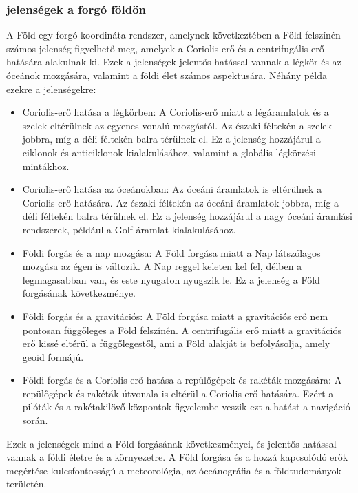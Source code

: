 \documentclass[../main.tex]{subfiles}
\begin{document}
\subsubsection{jelenségek a forgó földön}
A Föld egy forgó koordináta-rendszer, amelynek következtében a Föld felszínén számos jelenség figyelhető meg, amelyek a Coriolis-erő és a centrifugális erő hatására alakulnak ki. Ezek a jelenségek jelentős hatással vannak a légkör és az óceánok mozgására, valamint a földi élet számos aspektusára. Néhány példa ezekre a jelenségekre:
\begin{itemize}
    \item Coriolis-erő hatása a légkörben: A Coriolis-erő miatt a légáramlatok és a szelek eltérülnek az egyenes vonalú mozgástól. Az északi féltekén a szelek jobbra, míg a déli féltekén balra térülnek el. Ez a jelenség hozzájárul a ciklonok és anticiklonok kialakulásához, valamint a globális légkörzési mintákhoz.
    \item Coriolis-erő hatása az óceánokban: Az óceáni áramlatok is eltérülnek a Coriolis-erő hatására. Az északi féltekén az óceáni áramlatok jobbra, míg a déli féltekén balra térülnek el. Ez a jelenség hozzájárul a nagy óceáni áramlási rendszerek, például a Golf-áramlat kialakulásához.
    \item Földi forgás és a nap mozgása: A Föld forgása miatt a Nap látszólagos mozgása az égen is változik. A Nap reggel keleten kel fel, délben a legmagasabban van, és este nyugaton nyugszik le. Ez a jelenség a Föld forgásának következménye.
    \item Földi forgás és a gravitációs: A Föld forgása miatt a gravitációs erő nem pontosan függőleges a Föld felszínén. A centrifugális erő miatt a gravitációs erő kissé eltérül a függőlegestől, ami a Föld alakját is befolyásolja, amely geoid formájú.
    \item Földi forgás és a Coriolis-erő hatása a repülőgépek és rakéták mozgására: A repülőgépek és rakéták útvonala is eltérül a Coriolis-erő hatására. Ezért a pilóták és a rakétakilövő központok figyelembe veszik ezt a hatást a navigáció során.
\end{itemize}
Ezek a jelenségek mind a Föld forgásának következményei, és jelentős hatással vannak a földi életre és a környezetre. A Föld forgása és a hozzá kapcsolódó erők megértése kulcsfontosságú a meteorológia, az óceánográfia és a földtudományok területén.
\end{document}
